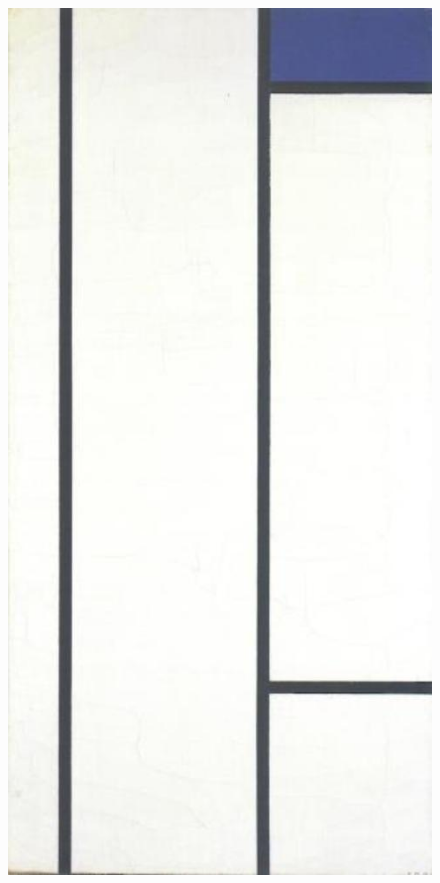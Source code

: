 \documentclass[serif,article,noparskip]{agse-thesis}
\begin{document}
\begin{figure}[b]
\begin{minipage}{0.2\textwidth}
  \includegraphics[width=\linewidth]{images/B244.jpg}
\end{minipage}

\end{figure}
\end{document}
